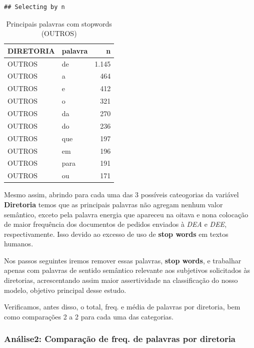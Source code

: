 \documentclass[]{article}
\begin{document}
\begin{verbatim}
## Selecting by n
\end{verbatim}

\begin{table}[!h]

\caption{\label{tab:unnamed-chunk-27}Principais palavras com stopwords (OUTROS)}
\centering
\begin{tabular}{llr}
\toprule
DIRETORIA & palavra & n\\
\midrule
\rowcolor{gray!6}  OUTROS & de & 1.145\\
OUTROS & a & 464\\
\rowcolor{gray!6}  OUTROS & e & 412\\
OUTROS & o & 321\\
\rowcolor{gray!6}  OUTROS & da & 270\\
\addlinespace
OUTROS & do & 236\\
\rowcolor{gray!6}  OUTROS & que & 197\\
OUTROS & em & 196\\
\rowcolor{gray!6}  OUTROS & para & 191\\
OUTROS & ou & 171\\
\bottomrule
\end{tabular}
\end{table}

Mesmo assim, abrindo para cada uma das 3 possíveis cateogorias da
variável \textbf{Diretoria} temos que as principais palavras não agregam
nenhum valor semântico, exceto pela palavra energia que apareceu na
oitava e nona colocação de maior frequência dos documentos de pedidos
enviados à \emph{DEA} e \emph{DEE}, respectivamente. Isso devido ao
excesso de uso de \textbf{stop words} em textos humanos.

Nos passos seguintes iremos remover essas palavras, \textbf{stop words},
e trabalhar apenas com palavras de sentido semântico relevante aos
subjetivos solicitados às diretorias, acrescentando assim maior
assertividade na classificação do nosso modelo, objetivo principal desse
estudo.

Verificamos, antes disso, o total, freq. e média de palavras por
diretoria, bem como comparações 2 a 2 para cada uma das categorias.

\subsubsection{Análise2: Comparação de freq. de palavras por
diretoria}\label{analise2-comparacao-de-freq.-de-palavras-por-diretoria}
\end{document}
